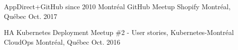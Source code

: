 

\begin{cvhonors}

  \cvhonor
    {AppDirect+GitHub since 2010} %
    {Montréal GitHub Meetup} %
    {Shopify Montréal, Québec} %
    {Oct. 2017} %

  \cvhonor
    {HA Kubernetes Deployment} %
    {Meetup \#2 - User stories, Kubernetes-Montréal} %
    {CloudOps Montréal, Québec} %
    {Oct. 2016} %

\end{cvhonors}